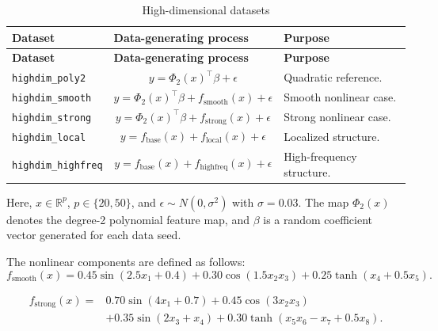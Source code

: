 \documentclass[]{interact}
\theoremstyle{plain}
\theoremstyle{definition}
\theoremstyle{remark}
\begin{document}
\begin{longtable}{p{}p{}p{}}
\caption{High-dimensional datasets}
\label{tab:highdim-datasets} \\
\toprule
\textbf{Dataset} & \textbf{Data-generating process} & \textbf{Purpose} \\
\midrule
\endfirsthead

\toprule
\textbf{Dataset} & \textbf{Data-generating process} & \textbf{Purpose} \\
\midrule
\endhead

\bottomrule
\endlastfoot

\texttt{highdim\_poly2}
&
\[
y=\Phi_2(x)^\top\beta+\epsilon
\]
& Quadratic reference. \\

\addlinespace[0.4em]

\texttt{highdim\_smooth}
&
\[
y=\Phi_2(x)^\top\beta+f_{\mathrm{smooth}}(x)+\epsilon
\]
& Smooth nonlinear case. \\

\addlinespace[0.4em]

\texttt{highdim\_strong}
&
\[
y=\Phi_2(x)^\top\beta+f_{\mathrm{strong}}(x)+\epsilon
\]
& Strong nonlinear case. \\

\addlinespace[0.4em]

\texttt{highdim\_local}
&
\[
y=f_{\mathrm{base}}(x)+f_{\mathrm{local}}(x)+\epsilon
\]
& Localized structure. \\

\addlinespace[0.4em]

\texttt{highdim\_highfreq}
&
\[
y=f_{\mathrm{base}}(x)+f_{\mathrm{highfreq}}(x)+\epsilon
\]
& High-frequency structure. \\

\end{longtable}

Here, \(x\in\mathbb{R}^p\), \(p\in\{20,50\}\), and 
\(\epsilon\sim N(0,\sigma^2)\) with \(\sigma=0.03\). 
The map \(\Phi_2(x)\) denotes the degree-2 polynomial feature map, and 
\(\beta\) is a random coefficient vector generated for each data seed.

The nonlinear components are defined as follows:
\[
f_{\mathrm{smooth}}(x)
=
0.45\sin(2.5x_1+0.4)
+
0.30\cos(1.5x_2x_3)
+
0.25\tanh(x_4+0.5x_5).
\]

\[
\begin{aligned}
f_{\mathrm{strong}}(x)
={}&
0.70\sin(4x_1+0.7)
+
0.45\cos(3x_2x_3)  \\
&+
0.35\sin(2x_3+x_4)
+
0.30\tanh(x_5x_6-x_7+0.5x_8).
\end{aligned}
\]
\end{document}
